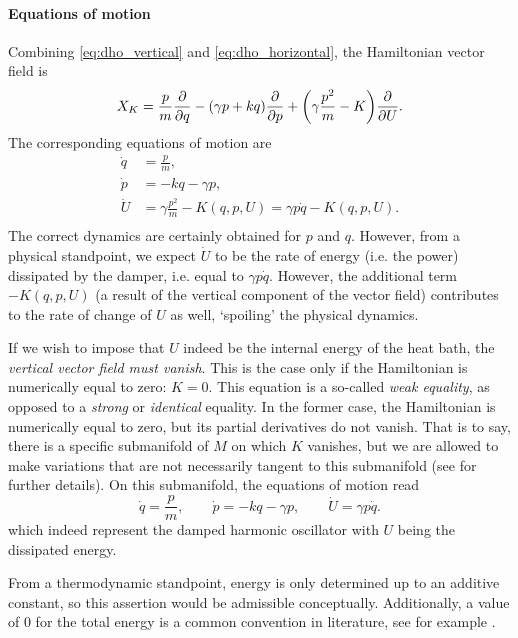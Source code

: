 \paragraph{Equations of motion} Combining \cref{eq:dho_vertical} and \cref{eq:dho_horizontal}, the Hamiltonian vector field is
\begin{equation}
     X_K = \frac{p}{m}\pdv{}{q} - (\gamma p + kq)\pdv{}{p} + \qty(\gamma \frac{p^2}{m} - K)\pdv{}{U}.
\end{equation}
The corresponding equations of motion are 
\begin{equation}
    \begin{split}
        \dot{q} &= \frac{p}{m}, \\
        \dot{p} &= -kq -\gamma p, \\
        \dot{U} &= \gamma \frac{p^2}{m} - K(q, p, U) = \gamma p\dot{q} - K(q, p, U). \\
    \end{split}
\end{equation}
The correct dynamics are certainly obtained for \(p\) and \(q\). However, from a physical standpoint, we expect \(\dot{U}\) to be the rate of energy (i.e. the power) dissipated by the damper, i.e. equal to \(\gamma p \dot{q}\). However, the additional term \(-K(q, p, U)\) (a result of the vertical component of the vector field) contributes to the rate of change of \(U\) as well, `spoiling' the physical dynamics.

If we wish to impose that \(U\) indeed be the internal energy of the heat bath, the \emph{vertical vector field must vanish}. This is the case only if the Hamiltonian is numerically equal to zero: \(K = 0\). This equation is a so-called \emph{weak equality}, as opposed to a \emph{strong} or \emph{identical} equality. In the former case, the Hamiltonian is numerically equal to zero, but its partial derivatives do not vanish. That is to say, there is a specific submanifold of \(M\) on which \(K\) vanishes, but we are allowed to make variations that are not necessarily tangent to this submanifold (see \citet{Dirac1950} for further details). On this submanifold, the equations of motion read
\begin{equation}
        \dot{q} = \frac{p}{m}, \qquad \dot{p} = -kq -\gamma p, \qquad 
        \dot{U} = \gamma p\dot{q}.
\end{equation}
which indeed represent the damped harmonic oscillator with \(U\) being the dissipated energy.

From a thermodynamic standpoint, energy is only determined up to an additive constant, so this assertion would be admissible conceptually. Additionally, a value of 0 for the total energy is a common convention in literature, see for example \citet{Fermi1936}.

